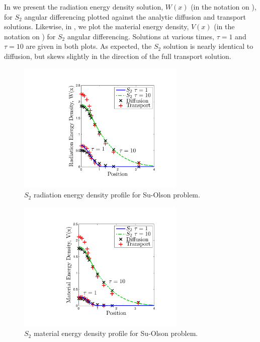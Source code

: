 In  we present the radiation energy density solution, $W(x)$ (in the notation on \cite{su_olson_1}), for $S_2$ angular differencing plotted against the analytic diffusion and transport solutions.  Likewise, in , we plot the material energy density, $V(x)$ (in the notation on \cite{su_olson_1}) for $S_2$ angular differencing.
Solutions at various times, $\tau = 1$ and $\tau=10$ are given in both plots.
As expected, the $S_2$ solution is nearly identical to diffusion, but skews slightly in the direction of the full transport solution.
\begin{figure}[!htp]
\centering
\includegraphics[width=8cm,trim=1.75in  0.5in 0.75in 0.5in,clip=true]{chapter6_grey_radtran/Dissertation_Data/Su_Olson_S2_Radiation_Energy.pdf}
\caption{$S_2$ radiation energy density profile for Su-Olson problem.}
\label{fig:su_olson_s2_rad}
\end{figure}
\begin{figure}[!hbp]
\centering
\includegraphics[width=8cm,trim=1.75in  0.5in 0.75in 0.5in,clip=true]{chapter6_grey_radtran/Dissertation_Data/Su_Olson_S2_Material_Energy.pdf}
\caption{$S_2$ material energy density profile for Su-Olson problem.}
\label{fig:su_olson_s2_mat}
\end{figure}

